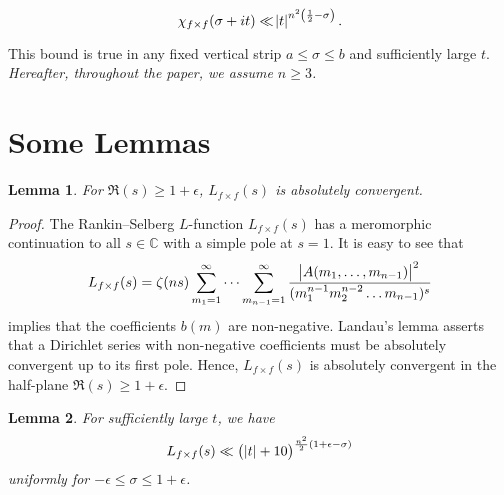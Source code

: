 \documentclass[sn-mathphys,Numbered]{sn-jnl}
\theoremstyle{thmstyleone}%
\newtheorem{lemma}{Lemma}[section]
\theoremstyle{thmstyletwo}%
\theoremstyle{thmstylethree}%
\begin{document}
$$ \chi_{f \times f}(\sigma+it) \ll \abs{t}^{n^2 \left( \frac{1}{2}-\sigma \right)}.$$

This bound is true in any fixed vertical strip $a \leq \sigma \leq b$ and sufficiently large $t$. \\
\emph{Hereafter, throughout the paper, we assume $n \geq 3$.} \\



\section{Some Lemmas} 

\begin{lemma} \label{l1}
For $\Re(s) \geq 1+\epsilon$, $L_{f \times f}(s)$ is absolutely convergent.
\end{lemma}

\begin{proof}
The Rankin--Selberg $L$-function $L_{f \times f}(s)$ has a meromorphic continuation to all $s \in \mathbb{C}$ with a simple pole at $s=1$. It is easy to see that
$$ L_{f\times f}(s) = \zeta(ns) \sum_{m_1=1}^{\infty} \dots \sum_{m_{n-1}=1}^{\infty} \frac{\abs{A(m_1,\dots,m_{n-1})}^2}{(m_1^{n-1} m_2^{n-2} \dots m_{n-1})^s}$$ 
implies that the coefficients $b(m)$ are non-negative. Landau's lemma asserts that a Dirichlet series with non-negative coefficients must be absolutely convergent up to its first pole. Hence, $L_{f \times f}(s)$ is absolutely convergent in the half-plane $\Re(s) \geq 1+\epsilon$.

\end{proof}

\begin{lemma} \label{l2}
For sufficiently large $t$, we have
$$ L_{f \times f}(s) \ll \left(\, \abs{t}+10 \right)^{\frac{n^2}{2}(1+\epsilon-\sigma)}  $$
uniformly for $-\epsilon \leq \sigma \leq 1+\epsilon$.
\end{lemma}
\end{document}
